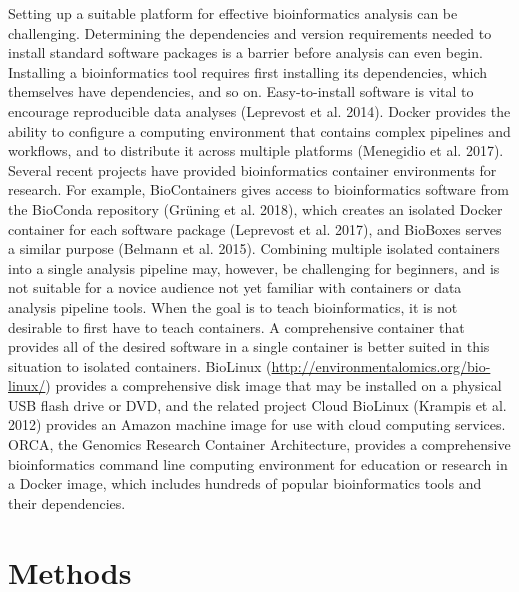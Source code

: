 \documentclass[
  12pt,
  oneside,
  openany]{book}
\begin{document}
Setting up a suitable platform for effective bioinformatics analysis can be challenging. Determining the dependencies and version requirements needed to install standard software packages is a barrier before analysis can even begin. Installing a bioinformatics tool requires first installing its dependencies, which themselves have dependencies, and so on. Easy-to-install software is vital to encourage reproducible data analyses (Leprevost et al. 2014). Docker provides the ability to configure a computing environment that contains complex pipelines and workflows, and to distribute it across multiple platforms (Menegidio et al. 2017). Several recent projects have provided bioinformatics container environments for research. For example, BioContainers gives access to bioinformatics software from the BioConda repository (Grüning et al. 2018), which creates an isolated Docker container for each software package (Leprevost et al. 2017), and BioBoxes serves a similar purpose (Belmann et al. 2015). Combining multiple isolated containers into a single analysis pipeline may, however, be challenging for beginners, and is not suitable for a novice audience not yet familiar with containers or data analysis pipeline tools. When the goal is to teach bioinformatics, it is not desirable to first have to teach containers. A comprehensive container that provides all of the desired software in a single container is better suited in this situation to isolated containers. BioLinux (\url{http://environmentalomics.org/bio-linux/}) provides a comprehensive disk image that may be installed on a physical USB flash drive or DVD, and the related project Cloud BioLinux (Krampis et al. 2012) provides an Amazon machine image for use with cloud computing services. ORCA, the Genomics Research Container Architecture, provides a comprehensive bioinformatics command line computing environment for education or research in a Docker image, which includes hundreds of popular bioinformatics tools and their dependencies.

\hypertarget{methods-3}{%
\section{Methods}\label{methods-3}}
\end{document}
